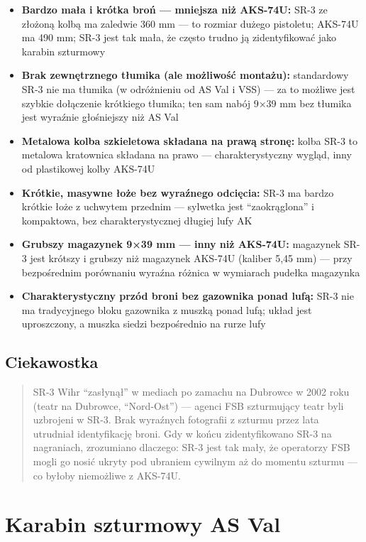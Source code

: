 \documentclass[12pt,oneside]{book}
\providecommand{\tightlist}{%
  \setlength{\itemsep}{0pt}\setlength{\parskip}{0pt}}
\begin{document}
\begin{itemize}
\tightlist
\item
  \textbf{Bardzo mała i krótka broń --- mniejsza niż AKS-74U:} SR-3 ze
  złożoną kolbą ma zaledwie 360 mm --- to rozmiar dużego pistoletu;
  AKS-74U ma 490 mm; SR-3 jest tak mała, że często trudno ją
  zidentyfikować jako karabin szturmowy
\item
  \textbf{Brak zewnętrznego tłumika (ale możliwość montażu):}
  standardowy SR-3 nie ma tłumika (w odróżnieniu od AS Val i VSS) --- za
  to możliwe jest szybkie dołączenie krótkiego tłumika; ten sam nabój
  9×39 mm bez tłumika jest wyraźnie głośniejszy niż AS Val
\item
  \textbf{Metalowa kolba szkieletowa składana na prawą stronę:} kolba
  SR-3 to metalowa kratownica składana na prawo --- charakterystyczny
  wygląd, inny od plastikowej kolby AKS-74U
\item
  \textbf{Krótkie, masywne łoże bez wyraźnego odcięcia:} SR-3 ma bardzo
  krótkie łoże z uchwytem przednim --- sylwetka jest ``zaokrąglona'' i
  kompaktowa, bez charakterystycznej długiej lufy AK
\item
  \textbf{Grubszy magazynek 9×39 mm --- inny niż AKS-74U:} magazynek
  SR-3 jest krótszy i grubszy niż magazynek AKS-74U (kaliber 5,45 mm)
  --- przy bezpośrednim porównaniu wyraźna różnica w wymiarach pudełka
  magazynka
\item
  \textbf{Charakterystyczny przód broni bez gazownika ponad lufą:} SR-3
  nie ma tradycyjnego bloku gazownika z muszką ponad lufą; układ jest
  uproszczony, a muszka siedzi bezpośrednio na rurze lufy
\end{itemize}

\subsection{Ciekawostka}\label{ciekawostka-67}

\begin{quote}
SR-3 Wihr ``zasłynął'' w mediach po zamachu na Dubrowce w 2002 roku
(teatr na Dubrowce, ``Nord-Ost'') --- agenci FSB szturmujący teatr byli
uzbrojeni w SR-3. Brak wyraźnych fotografii z szturmu przez lata
utrudniał identyfikację broni. Gdy w końcu zidentyfikowano SR-3 na
nagraniach, zrozumiano dlaczego: SR-3 jest tak mały, że operatorzy FSB
mogli go nosić ukryty pod ubraniem cywilnym aż do momentu szturmu --- co
byłoby niemożliwe z AKS-74U.
\end{quote}

\section{Karabin szturmowy AS Val}\label{karabin-szturmowy-as-val}
\end{document}
